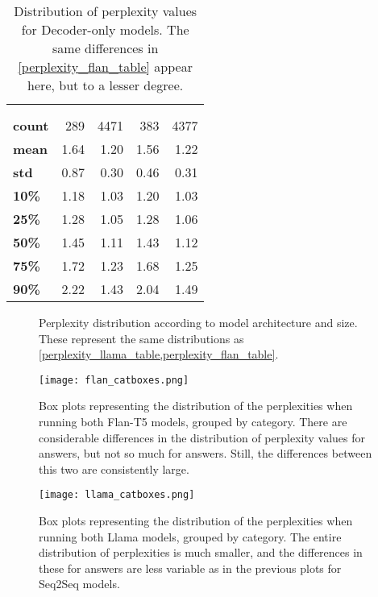 \begin{table}[ht]
	\centering
	\scriptsize
	\begin{tabular}{>{\bfseries}l | r r | r r}
		\toprule
			& \multicolumn{2}{|c}{\smallllama} & \multicolumn{2}{|c}{\bigllama} \\
			& \Parametric{} & \Contextual{} & \Parametric{} & \Contextual{} \\
		\midrule
			count & 289 & 4471 & 383 & 4377 \\
			mean & 1.64 & 1.20 & 1.56 & 1.22 \\
			std & 0.87 & 0.30 & 0.46 & 0.31 \\
			10\% & 1.18 & 1.03 & 1.20 & 1.03 \\
			25\% & 1.28 & 1.05 & 1.28 & 1.06 \\
			50\% & 1.45 & 1.11 & 1.43 & 1.12 \\
			75\% & 1.72 & 1.23 & 1.68 & 1.25 \\
			90\% & 2.22 & 1.43 & 2.04 & 1.49 \\
\bottomrule
	\end{tabular}
	\caption{Distribution of perplexity values for Decoder-only models. The same differences in \cref{perplexity_flan_table} appear here, but to a lesser degree.}
	\label{perplexity_llama_table}
\end{table}

\begin{figure}[H]
	\centering
	\caption{Perplexity distribution according to model architecture and size. These represent the same distributions as \cref{perplexity_llama_table,perplexity_flan_table}.}
	\label{perplexity_results}
\end{figure}

\begin{figure}[p]
	\texttt{[image: flan\_catboxes.png]}
	\caption{Box plots representing the distribution of the perplexities when running both Flan-T5 models, grouped by category. There are considerable differences in the distribution of perplexity values for \Parametric{} answers, but not so much for \Contextual{} answers. Still, the differences between this two are consistently large.}
	\label{flan_catboxes}
\end{figure}

\begin{figure}[p]
	\texttt{[image: llama\_catboxes.png]}
	\caption{Box plots representing the distribution of the perplexities when running both Llama models, grouped by category. The entire distribution of perplexities is much smaller, and the differences in these for \Parametric{} answers are less variable as in the previous plots for Seq2Seq models.}
	\label{llama_catboxes}
\end{figure}
